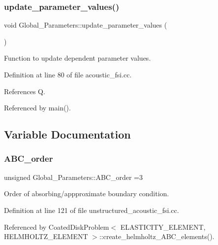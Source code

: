 \subsubsection{\texorpdfstring{update\+\_\+parameter\+\_\+values()}{update\_parameter\_values()}}
{\footnotesize\ttfamily void Global\+\_\+\+Parameters\+::update\+\_\+parameter\+\_\+values (\begin{DoxyParamCaption}{ }\end{DoxyParamCaption})}



Function to update dependent parameter values. 



Definition at line 80 of file acoustic\+\_\+fsi.\+cc.



References Q.



Referenced by main().



\subsection{Variable Documentation}
\mbox{\label{namespaceGlobal__Parameters_ae16eb10039cab2098b02ec7dff946277}} 
\subsubsection{\texorpdfstring{A\+B\+C\+\_\+order}{ABC\_order}}
{\footnotesize\ttfamily unsigned Global\+\_\+\+Parameters\+::\+A\+B\+C\+\_\+order =3}



Order of absorbing/appproximate boundary condition. 



Definition at line 121 of file unstructured\+\_\+acoustic\+\_\+fsi.\+cc.



Referenced by Coated\+Disk\+Problem$<$ E\+L\+A\+S\+T\+I\+C\+I\+T\+Y\+\_\+\+E\+L\+E\+M\+E\+N\+T, H\+E\+L\+M\+H\+O\+L\+T\+Z\+\_\+\+E\+L\+E\+M\+E\+N\+T $>$\+::create\+\_\+helmholtz\+\_\+\+A\+B\+C\+\_\+elements().

\mbox{\label{namespaceGlobal__Parameters_afbe27ad463a1fb23cb99d029a9fac731}} 
